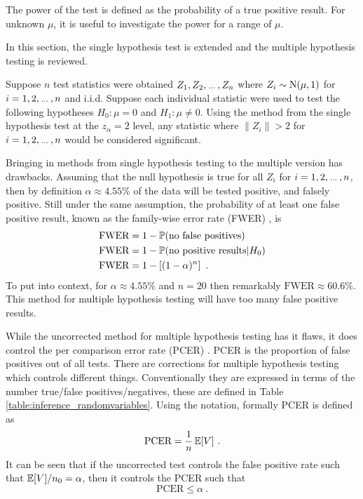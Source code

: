 The power of the test is defined as the probability of a true positive result. For unknown $\mu$, it is useful to investigate the power for a range of $\mu$.

In this section, the single hypothesis test is extended and the multiple hypothesis testing \citep{shaffer1995multiple, dudoit2003multiple} is reviewed.

Suppose $n$ test statistics were obtained $Z_1,Z_2,\dotdotdot,Z_n$ where $Z_i\sim\operatorname{N}(\mu,1)$ for $i=1,2,\dotdotdot,n$ and i.i.d. Suppose each individual statistic were used to test the following hypotheses $H_0:\mu=0$ and $H_1:\mu\neq 0$. Using the method from the single hypothesis test at the $z_\alpha=2$ level, any statistic where $\|Z_i\|>2$ for $i=1,2,\dotdotdot,n$ would be considered significant.

Bringing in methods from single hypothesis testing to the multiple version has drawbacks. Assuming that the null hypothesis is true for all $Z_i$ for $i=1,2,\dotdotdot,n$, then by definition $\alpha\approx 4.55\%$ of the data will be tested positive, and falsely positive. Still under the same assumption, the probability of at least one false positive result, known as the family-wise error rate (FWER) \citep{shaffer1995multiple}, is
\begin{align}
    \text{FWER}&=1-\operatorname{\mathbb{P}}(\text{no false positives}) \nonumber\\
    \text{FWER}&=1-\operatorname{\mathbb{P}}(\text{no positive results}|H_0) \nonumber\\
    \text{FWER}&=1-\left[(1-\alpha)^n\right] \label{eq:inference_fwer}\ .
\end{align}
To put into context, for $\alpha\approx 4.55\%$ and $n=20$ then remarkably $\text{FWER}\approx60.6\%$. This method for multiple hypothesis testing will have too many false positive results.

While the uncorrected method for multiple hypothesis testing has it flaws, it does control the per comparison error rate (PCER) \citep{benjamini1995controlling}. PCER is the proportion of false positives out of all tests. There are corrections for multiple hypothesis testing which controls different things. Conventionally they are expressed in terms of the number true/false positives/negatives, these are defined in Table \ref{table:inference_randomvariables}. Using the notation, formally PCER is defined as
\begin{equation}
    \text{PCER}=
    \dfrac{
        1
    }
    {
        n
    }
    \operatorname{\mathbb{E}}[V]
    \ .
\end{equation}
It can be seen that if the uncorrected test controls the false positive rate such that $\operatorname{\mathbb{E}}[V]/n_0 = \alpha$, then it controls the PCER such that
\begin{equation}
    \text{PCER}\leqslant\alpha \ .
\end{equation}

